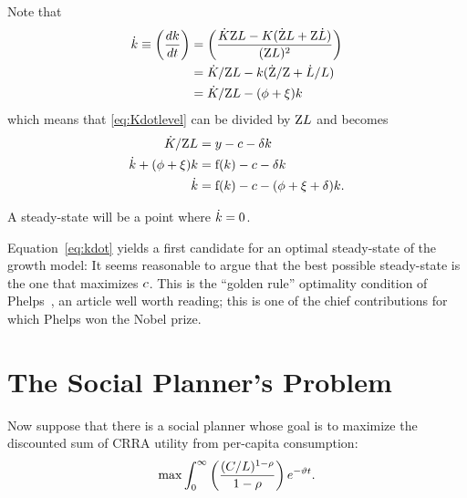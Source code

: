 \documentclass{handout}
\begin{document}
Note that 
\begin{equation}\begin{gathered}\begin{aligned}
  \dot{{k}} \equiv       \left(\frac{d{k}}{dt}\right) & =  \left(\frac{\dot{{K}}\mathrm{Z} L - K(\dot{\mathrm{Z} }L + \mathrm{Z} \dot{L})}{(\mathrm{Z} L)^{2}}\right) 
  \\   & =  \dot{{K}}/\mathrm{Z} L - k(\dot{\mathrm{Z} }/{\mathrm{Z} } + \dot{L}/L)
  \\          & =  \dot{{K}}/\mathrm{Z} L - (\phi +\xi)k
\end{aligned}\end{gathered}\end{equation}
which means that \eqref{eq:Kdotlevel} can be divided by $\mathrm{Z} L$ and becomes
\begin{equation}\begin{gathered}\begin{aligned}
  \dot{{K}}/\mathrm{Z} L & =  {y} - c - \delta {k}  \\
  \dot{{k}}+(\phi +\xi)k & =  \mathrm{f}({k}) - c - \delta {k}  \\
  \dot{{k}} & =  \mathrm{f}({k}) - c - (\phi +\xi+\delta) {k} \label{eq:kdot}.
\end{aligned}\end{gathered}\end{equation}

A steady-state will be a point where $\dot{{k}} = 0$.

Equation~\eqref{eq:kdot}  yields a first candidate for an optimal
steady-state of the growth model: It seems reasonable to argue that the best
possible steady-state is the one that maximizes $c$.  This is the
``golden rule'' optimality condition of
Phelps~\cite{phelps:golden}, an article well worth reading; this is
one of the chief contributions for which Phelps won the Nobel prize.

\section{The Social Planner's Problem}

Now suppose that there is a social planner whose goal is to maximize the discounted
sum of CRRA utility from per-capita consumption:
\begin{equation}
  \max \int_{0}^{\infty} \left(\frac{(C/L)^{1-\rho}}{1-\rho}\right) e^{-\vartheta  t} \label{eq:maxprob}.  
\end{equation}
\end{document}
